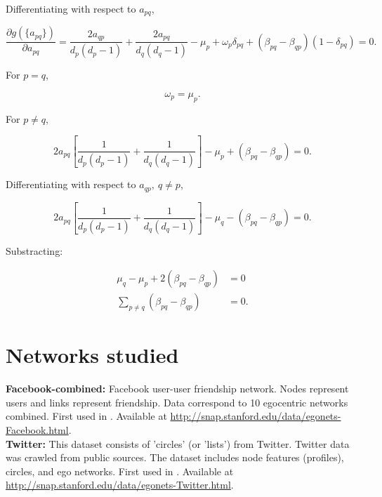 \documentclass{article}
\begin{document}
Differentiating with respect to $a_{pq}$,

\begin{equation}
    \dfrac{\partial g(\lbrace a_{pq} \rbrace)}{\partial a_{pq}} = \dfrac{2 a_{qp} }{d_p (d_p - 1)} + \dfrac{2 a_{pq}}{d_q (d_q - 1)} - \mu_p + \omega_p \delta_{pq} + (\beta_{pq} - \beta_{qp}) (1-\delta_{pq}) = 0.
\end{equation}

For $p=q$,

\begin{equation}
    \omega_p = \mu_p.
\end{equation}

For $p\neq q$,

\begin{equation}
    2 a_{pq}\left[\dfrac{1}{d_p (d_p - 1)} + \dfrac{1}{d_q (d_q - 1)} \right]- \mu_p + (\beta_{pq} - \beta_{qp}) = 0.
\end{equation}

Differentiating with respect to $a_{qp},\: q\neq p$,

\begin{equation}
    2 a_{pq}\left[\dfrac{1}{d_p (d_p - 1)} + \dfrac{1}{d_q (d_q - 1)} \right]- \mu_q - (\beta_{pq} - \beta_{qp}) = 0.
\end{equation}

Substracting:

\begin{align}
    \mu_q - \mu_p + 2 (\beta_{pq} - \beta_{qp}) &= 0 \nonumber \\
    \sum_{p\neq q}(\beta_{pq} - \beta_{qp}) &= 0.
\end{align}

\section{Networks studied} \label{app:NetworksStudied}

\textbf{Facebook-combined:} Facebook user-user friendship network. Nodes represent users and links represent friendship. Data correspond to 10 egocentric networks combined. First used in \cite{Leskovec2012LearningNetworks}. Available at \url{http://snap.stanford.edu/data/egonets-Facebook.html}.\\

\textbf{Twitter:} This dataset consists of 'circles' (or 'lists') from Twitter. Twitter data was crawled from public sources. The dataset includes node features (profiles), circles, and ego networks.  First used in \cite{Leskovec2012LearningNetworks}. Available at \url{http://snap.stanford.edu/data/egonets-Twitter.html}.\\
\end{document}
